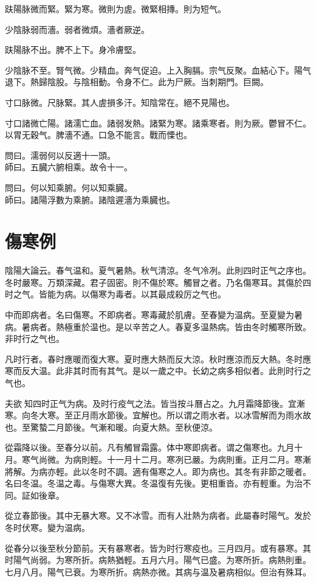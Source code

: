 趺陽脉微而緊。緊为寒。微則为虗。微緊相摶。則为短气。

少陰脉弱而濇。弱者微煩。濇者厥逆。

趺陽脉不出。脾不上下。身冷膚堅。

少陰脉不至。腎气微。少精血。奔气促迫。上入胸膈。宗气反聚。血結心下。陽气退下。熱歸陰股。与陰相動。令身不仁。此为尸厥。当刺期門。巨闕。

寸口脉微。尺脉緊。其人虗損多汗。知陰常在。絕不見陽也。

寸口諸微亡陽。諸濡亡血。諸弱发熱。諸緊为寒。諸乘寒者。則为厥。鬱冒不仁。以胃无穀气。脾濇不通。口急不能言。戰而慄也。

問曰。濡弱何以反適十一頭。\\
師曰。五臓六腑相乘。故令十一。

問曰。何以知乘腑。何以知乘臓。\\
師曰。諸陽浮數为乘腑。諸陰遲濇为乘臓也。

\chapter{傷寒例}

陰陽大論云。春气温和。夏气暑熱。秋气清涼。冬气冷冽。此則四时正气之序也。冬时嚴寒。万類深藏。君子固密。則不傷於寒。觸冒之者。乃名傷寒耳。其傷於四时之气。皆能为病。以傷寒为毒者。以其最成殺厉之气也。

中而即病者。名曰傷寒。不即病者。寒毒藏於肌膚。至春變为温病。至夏變为暑病。暑病者。熱極重於温也。是以辛苦之人。春夏多温熱病。皆由冬时觸寒所致。非时行之气也。

凡时行者。春时應暖而復大寒。夏时應大熱而反大涼。秋时應涼而反大熱。冬时應寒而反大温。此非其时而有其气。是以一歲之中。长幼之病多相似者。此則时行之气也。

夫欲{\sungtpii 𠊱}知四时正气为病。及时行疫气之法。皆当按斗曆占之。九月霜降節後。宜漸寒。向冬大寒。至正月雨水節後。宜解也。所以谓之雨水者。以冰雪解而为雨水故也。至驚蟄二月節後。气漸和暖。向夏大熱。至秋便涼。

從霜降以後。至春分以前。凡有觸冒霜露。体中寒即病者。谓之傷寒也。九月十月。寒气尚微。为病則輕。十一月十二月。寒冽已嚴。为病則重。正月二月。寒漸將解。为病亦輕。此以冬时不調。適有傷寒之人。即为病也。其冬有非節之暖者。名曰冬温。冬温之毒。与傷寒大異。冬温復有先後。更相重沓。亦有輕重。为治不同。証如後章。

從立春節後。其中无暴大寒。又不冰雪。而有人壯熱为病者。此屬春时陽气。发於冬时伏寒。變为温病。

從春分以後至秋分節前。天有暴寒者。皆为时行寒疫也。三月四月。或有暴寒。其时陽气尚弱。为寒所折。病熱猶輕。五月六月。陽气已盛。为寒所折。病熱則重。七月八月。陽气已衰。为寒所折。病熱亦微。其病与温及暑病相似。但治有殊耳。

